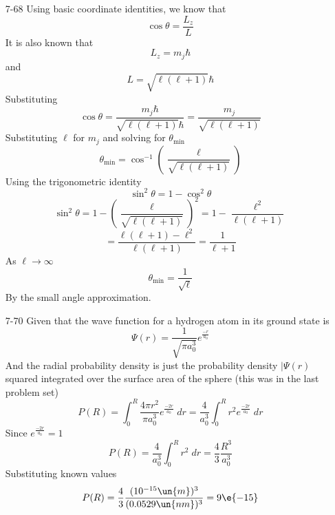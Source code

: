 \documentclass[12pt]{2620hw}
\begin{document}
\begin{enumerate}
\item [7-68] Using basic coordinate identities, we know that
\[
	\cos \theta = \frac{L_z}{L}
\]
It is also known that 
\[
	L_z = m_{j}\hbar
\]
and 
\[
	L = \sqrt{ \ell (\ell +1) } \hbar
\]
Substituting
\[
	\cos \theta = \frac{m_{j}\hbar}{\sqrt{ \ell (\ell +1) } \hbar}  = \frac{m_{j}}{\sqrt{ \ell (\ell +1) }}
\]
Substituting $\ell$ for $m_{j}$ and solving for $\theta_{\text{min}}$
\[
	\theta_{\text{min}} = \cos^{-1} \left(\frac{\ell}{\sqrt{\ell(\ell+1)}} \right)
\]
Using the trigonometric identity
\[
	\sin^2 \theta = 1 - \cos^2 \theta
\]
\[
	\sin^2 \theta = 1 - \left( \frac{\ell}{\sqrt{ \ell (\ell +1) }}\right)^2 = 1 - \frac{\ell^2}{\ell(\ell+1)}
\]
\[
	= \frac{\ell(\ell+1)- \ell^2}{\ell(\ell+1)} = \frac{1}{\ell + 1}
\]
As $\ell \rightarrow \infty$
\[
	\theta_{\text{min}} = \frac{1}{\sqrt{\ell}}
\]
By the small angle approximation.

\item [7-70] Given that the wave function for a hydrogen atom in its ground state is 
\[
	\Psi(r) = \frac{1}{\sqrt{\pi a_0^3}}e^{\frac{-r}{a_0}}
\]
And the radial probability density is just the probability density $|\Psi(r)$ squared integrated over the surface area of the sphere (this was in the last problem set)
\[
	P(R) = \int_0^R \frac{4 \pi r^2}{\pi a_0^3}e^{\frac{-2r}{a_0}} \; dr  = \frac{4}{a_0^3}\int_0^Rr^2 e^{\frac{-2r}{a_0}} \; dr 
\]
Since $e^{\frac{-2r}{a_0}} = 1$
\[
	P(R) = \frac{4}{a_0^3}\int_0^Rr^2 \; dr = \frac{4}{3}\frac{R^3}{a_0^3}
\]
Substituting known values
\[
	P(R) = \frac{4}{3}\frac{(10^{-15}\un{m})^3}{(0.0529\un{nm})^3}	 = 9\e{-15}
\]

\end{enumerate}
\end{document}
